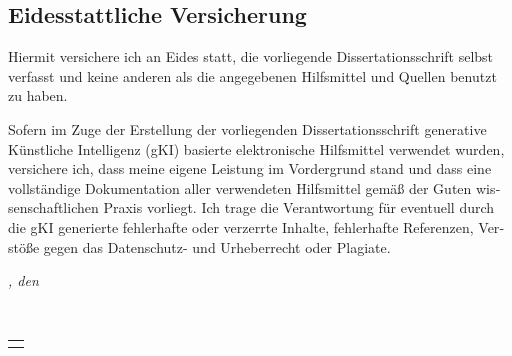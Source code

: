 \begin{otherlanguage}{ngerman}

	\chapter*{Eidesstattliche Versicherung}
	\thispagestyle{empty}
	Hiermit versichere ich an Eides statt, die vorliegende Dissertationsschrift selbst verfasst und
	keine anderen als die angegebenen Hilfsmittel und Quellen benutzt zu haben.

	Sofern im Zuge der Erstellung der vorliegenden Dissertationsschrift generative Künstliche
	Intelligenz (gKI) basierte elektronische Hilfsmittel verwendet wurden, versichere ich, dass meine
	eigene Leistung im Vordergrund stand und dass eine vollständige Dokumentation aller
	verwendeten Hilfsmittel gemäß der Guten wissenschaftlichen Praxis vorliegt. Ich trage die
	Verantwortung für eventuell durch die gKI generierte fehlerhafte oder verzerrte Inhalte,
	fehlerhafte Referenzen, Verstöße gegen das Datenschutz- und Urheberrecht oder Plagiate.


	\bigskip

	\noindent\textit{\myLocation, den \myTime}

	\smallskip

	\begin{flushright}
		\phantom{add signature here} \phantom{~~~~~~~~~~~~}\\
		\vspace{-0.5cm}
	    \begin{tabular}{m{5cm}}
	        \\ \hline
	        \centering\myName \\
	    \end{tabular}
	\end{flushright}

\end{otherlanguage}
